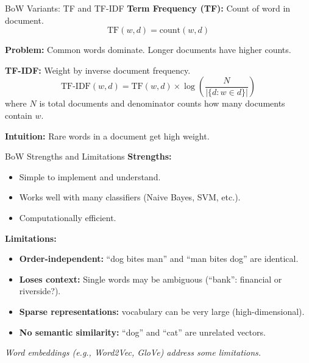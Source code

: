 \documentclass[10pt]{beamer}
\begin{document}
\begin{frame}{BoW Variants: TF and TF-IDF}
    \textbf{Term Frequency (TF):} Count of word in document.
    \[
        \text{TF}(w, d) = \text{count}(w, d)
    \]

    \vspace{0.2cm}
    \textbf{Problem:} Common words dominate. Longer documents have higher counts.

    \vspace{0.25cm}
    \textbf{TF-IDF:} Weight by inverse document frequency.
    \[
        \text{TF-IDF}(w, d) = \text{TF}(w, d) \times \log\left(\frac{N}{|\{d : w \in d\}|}\right)
    \]
    where $N$ is total documents and denominator counts how many documents contain $w$.

    \vspace{0.2cm}
    \textbf{Intuition:} Rare words in a document get high weight.
\end{frame}

\begin{frame}{BoW Strengths and Limitations}
    \textbf{Strengths:}
    \begin{itemize}
        \item Simple to implement and understand.
        \item Works well with many classifiers (Naive Bayes, SVM, etc.).
        \item Computationally efficient.
    \end{itemize}

    \vspace{0.2cm}
    \textbf{Limitations:}
    \begin{itemize}
        \item \textbf{Order-independent:} ``dog bites man'' and ``man bites dog'' are identical.
        \item \textbf{Loses context:} Single words may be ambiguous (``bank'': financial or riverside?).
        \item \textbf{Sparse representations:} vocabulary can be very large (high-dimensional).
        \item \textbf{No semantic similarity:} ``dog'' and ``cat'' are unrelated vectors.
    \end{itemize}

    \vspace{0.2cm}
    \textit{Word embeddings (e.g., Word2Vec, GloVe) address some limitations.}
\end{frame}
\end{document}
